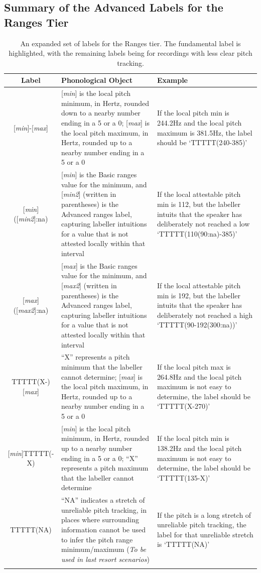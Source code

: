 \documentclass[11pt, twoside]{memoir}
\begin{document}
\subsection{Summary of the Advanced Labels for the Ranges Tier}\label{sec:summary-advanced-ranges-labels}
\begin{longtable}{cp{.46\linewidth}p{.32\linewidth}} \toprule \textbf{Label} & \textbf{Phonological Object} & \textbf{Example}\tabularnewline
\midrule \endhead
\rowcolor{green}
{[\textit{min}]-[\textit{max}]} &
	{[\textit{min}] is the local pitch minimum, in Hertz, rounded down to a nearby number ending in a 5 or a 0}; {[\textit{max}] is the local pitch maximum, in Hertz, rounded up to a nearby number ending in a 5 or a 0} &
	If the local pitch min is 244.2Hz and the local pitch maximum is 381.5Hz, the label should be ‘TTTTT(240-385)’
	\tabularnewline
{[\textit{min}]([\textit{min2}]:na)} &
	[\textit{min}] is the Basic ranges value for the minimum, and [\textit{min2}] (written in parentheses) is the Advanced ranges label, capturing labeller intuitions for a value that is not attested locally within that interval &
	If the local attestable pitch min is 112, but the labeller intuits that the speaker has deliberately not reached a low ‘TTTTT(110(90:na)-385)’
	\tabularnewline
{[\textit{max}]([\textit{max2}]:na)} &
	[\textit{max}] is the Basic ranges value for the minimum, and [\textit{max2}] (written in parentheses) is the Advanced ranges label, capturing labeller intuitions for a value that is not attested locally within that interval &
	If the local attestable pitch min is 192, but the labeller intuits that the speaker has deliberately not reached a high ‘TTTTT(90-192(300:na))’
	\tabularnewline
{TTTTT(X-)[\textit{max}]} &
	{“X” represents a pitch minimum that the labeller cannot determine}; {[\textit{max}] is the local pitch maximum, in Hertz, rounded up to a nearby number ending in a 5 or a 0}	 &
	If the local pitch max is 264.8Hz and the local pitch maximum is not easy to determine, the label should be ‘TTTTT(X-270)’
	\tabularnewline
{[\textit{min}]TTTTT(-X)} &
	{[\textit{min}] is the local pitch minimum, in Hertz, rounded up to a nearby number ending in a 5 or a 0}; {“X” represents a pitch maximum that the labeller cannot determine}	 &
	If the local pitch min is 138.2Hz and the local pitch maximum is not easy to determine, the label should be ‘TTTTT(135-X)’
	\tabularnewline
TTTTT(NA) &
	“NA” indicates a stretch of unreliable pitch tracking, in places where surrounding information cannot be used to infer the pitch range minimum\slash maximum (\textit{To be used in last resort scenarios}) &
	If the pitch is a long stretch of unreliable pitch tracking, the label for that unreliable stretch is ‘TTTTT(NA)’
	\tabularnewline
\bottomrule 
\caption[An expanded set of labels for the Ranges tier.]{An expanded set of labels for the Ranges tier. The fundamental label is highlighted, with the remaining labels being for recordings with less clear pitch tracking.}
\end{longtable}
\end{document}
